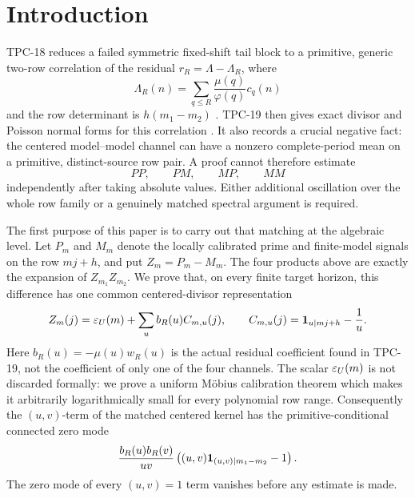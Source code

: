 \section{Introduction}
\label{sec:tpc20-introduction}

TPC-18 reduces a failed symmetric fixed-shift tail block to a primitive,
generic two-row correlation of the residual
\(
 r_R=\Lambda-\Lambda_R
\), where
\[
 \Lambda_R(n)=\sum_{q\le R}\frac{\mu(q)}{\varphi(q)}c_q(n)
\]
and the row determinant is \(h(m_1-m_2)\)
\citep{WangTPC18}.  TPC-19 then gives exact divisor and Poisson normal
forms for this correlation \citep{WangTPC19}.  It also records a crucial
negative fact: the centered model--model channel can have a nonzero
complete-period mean on a primitive, distinct-source row pair.  A proof
cannot therefore estimate
\[
 PP,\qquad PM,\qquad MP,\qquad MM
\]
independently after taking absolute values.  Either additional
oscillation over the whole row family or a genuinely matched spectral
argument is required.

The first purpose of this paper is to carry out that matching at the
algebraic level.  Let \(P_m\) and \(M_m\) denote the locally calibrated
prime and finite-model signals on the row \(mj+h\), and put
\(Z_m=P_m-M_m\).  The four products above are exactly the expansion of
\(Z_{m_1}Z_{m_2}\).  We prove that, on every finite target horizon, this
difference has one common centered-divisor representation
\begin{equation}
 Z_m(j)=\varepsilon_U(m)+
 \sum_u b_R(u)C_{m,u}(j),
 \qquad
 C_{m,u}(j)=\mathbf 1_{u\mid mj+h}-\frac1u.
 \label{eq:tpc20-intro-common-kernel}
\end{equation}
Here
\(
 b_R(u)=-\mu(u)w_R(u)
\)
is the actual residual coefficient found in TPC-19, not the coefficient
of only one of the four channels.  The scalar \(\varepsilon_U(m)\) is not
discarded formally: we prove a uniform M\"obius calibration theorem
which makes it arbitrarily logarithmically small for every polynomial
row range.  Consequently the \((u,v)\)-term of the matched centered
kernel has the primitive-conditional connected zero mode
\begin{equation}
 \frac{b_R(u)b_R(v)}{uv}
 \left((u,v)\mathbf 1_{(u,v)\mid m_1-m_2}-1\right).
 \label{eq:tpc20-intro-connected-mode}
\end{equation}
The zero mode of every \((u,v)=1\) term vanishes before any estimate is
made.

